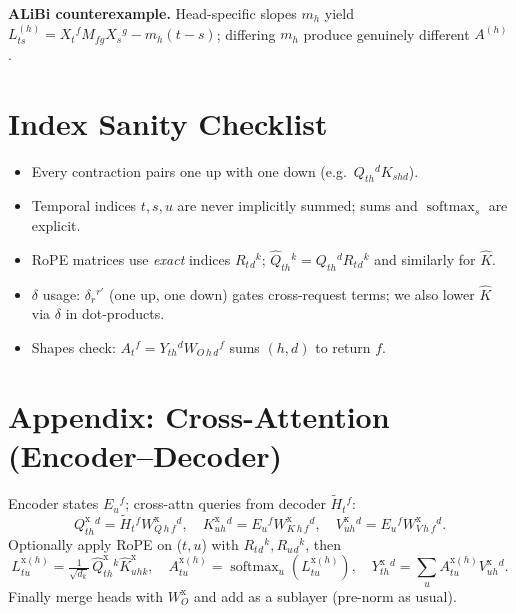 \documentclass[11pt]{article}
\newcommand{\softmax}{\operatorname{softmax}}
\begin{document}
\textbf{ALiBi counterexample.} Head-specific slopes $m_h$ yield $L_{t s}^{(h)}=X_t{}^{f} M_{f g} X_s{}^{g}-m_h (t-s)$; differing $m_h$ produce genuinely different $A^{(h)}$.

\section{Index Sanity Checklist}
\begin{itemize}
\item Every contraction pairs one up with one down (e.g.\ $Q_{t h}{}^{d}K_{s h d}$).
\item Temporal indices $t,s,u$ are never implicitly summed; sums and $\softmax_s$ are explicit.
\item RoPE matrices use \emph{exact} indices $R_{t}{}_{d}{}^{k}$; $\widehat Q_{t h}{}^{k}=Q_{t h}{}^{d} R_{t}{}_{d}{}^{k}$ and similarly for $\widehat K$.
\item $\delta$ usage: $\delta_{r}{}^{r'}$ (one up, one down) gates cross-request terms; we also lower $\widehat K$ via $\delta$ in dot-products.
\item Shapes check: $A_t{}^{f}=Y_{t h}{}^{d} W_{O\,h\,d}{}^{f}$ sums $(h,d)$ to return $f$.
\end{itemize}

\appendix
\section*{Appendix: Cross-Attention (Encoder--Decoder)}
Encoder states $E_{u}{}^{f}$; cross-attn queries from decoder $\widetilde H_t{}^{f}$:
\[
Q^{\mathrm{x}}_{t h}{}^{d}=\widetilde H_t{}^{f} W^{\mathrm{x}}_{Q\,h\,f}{}^{d},\quad
K^{\mathrm{x}}_{u h}{}^{d}=E_{u}{}^{f} W^{\mathrm{x}}_{K\,h\,f}{}^{d},\quad
V^{\mathrm{x}}_{u h}{}^{d}=E_{u}{}^{f} W^{\mathrm{x}}_{V\,h\,f}{}^{d}.
\]
Optionally apply RoPE on ($t,u$) with $R_{t}{}_{d}{}^{k}, R_{u}{}_{d}{}^{k}$, then
\[
L^{\mathrm{x}(h)}_{t u}=\tfrac{1}{\sqrt{d_k}}\, \widehat Q^{\mathrm{x}}_{t h}{}^{k}\widehat K^{\mathrm{x}}_{u h k},\quad
A^{\mathrm{x}(h)}_{t u}=\softmax_{u}(L^{\mathrm{x}(h)}_{t u}),\quad
Y^{\mathrm{x}}_{t h}{}^{d}=\sum_{u} A^{\mathrm{x}(h)}_{t u} V^{\mathrm{x}}_{u h}{}^{d}.
\]
Finally merge heads with $W_O^{\mathrm{x}}$ and add as a sublayer (pre-norm as usual).
\end{document}
